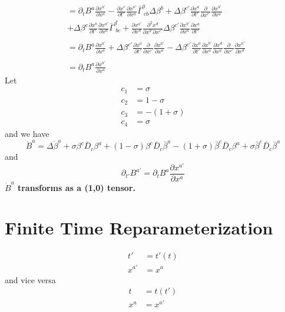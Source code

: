 \documentclass{article}
\begin{document}
\begin{align*}
\\
& = \partial_{t}B^{a}\frac{\partial x^{a'}}{\partial x^{a}} - \frac{\partial x^{c}}{\partial t'}\frac{\partial x^{a'}}{\partial x^{a}}{\bar \Gamma}^{a}_{~cb}\Delta \beta^{b} + \Delta \beta^{c'}\frac{\partial x^{a}}{\partial t'}\frac{\partial}{\partial x^{c'}}\frac{\partial  x^{a'}}{\partial x^{a}}\\
& + \Delta \beta^{c}\frac{\partial x^{b}}{\partial t'}\frac{\partial x^{a'}}{\partial x^{d}}{\bar \Gamma}^{d}_{~bc} + \frac{\partial x^{a'}}{\partial x^{d}}\frac{\partial^2 x^{d}}{\partial x^{b'}\partial x^{c'}}\Delta \beta^{c'}\frac{\partial x^{b'}}{\partial x^{a}}\frac{\partial x^{a}}{\partial t'}\\
\\
& = \partial_{t}B^{a}\frac{\partial x^{a'}}{\partial x^{a}} +  \Delta \beta^{c'}\frac{\partial x^{a}}{\partial t'}\frac{\partial}{\partial x^{c'}}\frac{\partial  x^{a'}}{\partial x^{a}} - \Delta \beta^{c'}\frac{\partial x^{a}}{\partial t'}\frac{\partial x^{b'}}{\partial x^{a}}\frac{\partial x^{d}}{\partial x^{b'}}\frac{\partial }{\partial x^{c'}}\frac{\partial x^{a'}}{\partial x^{d}}\\
\\
& = \partial_{t}B^{a}\frac{\partial x^{a'}}{\partial x^{a}}
\end{align*}
Let
\begin{align*}
c_{1} & = \sigma\\
c_{2} & = 1 - \sigma\\
c_{3} & = -(1+\sigma)\\
c_{4} & = \sigma
\end{align*}
and we have
\[
{\dot B}^{a} = \Delta {\dot \beta}^{a} + \sigma \beta^{c}{\bar D}_{c}\beta^{a} + (1 - \sigma)\beta^{c}{\bar D}_{c}{\bar \beta}^{a} - (1 + \sigma){\bar \beta}^{c}{\bar D}_{c}\beta^{a} + \sigma{\bar \beta}^{c}{\bar D}_{c}{\bar \beta}^{a}
\]
and
\[
\boxed{
\partial_{t'}B^{a'} = \partial_{t}B^{a}\frac{\partial x^{a'}}{\partial x^{a}}
}
\]
{\bf {\color{red}${\dot B}^{a}$ transforms as a (1,0) tensor.}}
\section{Finite Time Reparameterization}
\begin{align*}
t' & = t'(t)\\
x^{a'} & = x^{a}
\end{align*}
and vice versa
\begin{align*}
t & = t(t')\\
x^{a} & = x^{a'}
\end{align*}
\end{document}
